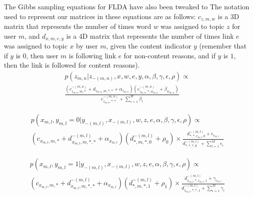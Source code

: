 \documentclass[a4paper]{article}
\begin{document}
The Gibbs sampling equations for FLDA have also been tweaked to 
The notation used to represent our matrices in these equations are as follows: $c_{z, m, w}$ is a 3D matrix that represents the number of times word $w$ was assigned to topic $z$ for user $m$, and $d_{x, m, e, y}$ is a 4D matrix that represents the number of times link $e$ was assigned to topic $x$ by user $m$, given the content indicator $y$ (remember that if $y$ is $0$, then user $m$ is following link $e$ for non-content reasons, and if $y$ is $1$, then the link is followed for content reasons).
\begin{equation}\label{eq:flda_sem}
  \begin{gathered}
    p(z_{m, n} | z_{-(m, n)}, x, w, e, y, \alpha, \beta, \gamma, \epsilon, \rho) \propto \\
      \frac{(c_{z_{m, n}, m, *}^{-(m, n)} + d_{z_{m, n}, m, *, *} + \alpha_{z_{m, n}})
      (c_{z_{m, n}, *, w_{m, n}}^{-(m, n)} + \beta_{w_{m, n}})}
      {c_{z_{m, n}, *, *}^{-(m, n)} + \sum^W_{i = 1}\beta_i}
  \end{gathered}
\end{equation}

\begin{equation}\label{eq:flda_net_0}
  \begin{gathered}
    p(x_{m, l}, y_{m, l} = 0 | y_{-(m, l)}, x_{-(m, l)}, w, z, e, \alpha, \beta, \gamma, \epsilon, \rho) \propto \\
      (c_{x_{m, l}, m, *} + d_{x_{m, l}, m, *, *}^{-(m, l)} + \alpha_{x_{m, l}})(d_{*, m, *, 0}^{-(m, l)} + \rho_0) \times
      \frac{d_{*, *, e_{m, l}, 0}^{-(m, l)} + \epsilon_{e_{m, l}}}
      {d_{*, *, *, 0}^{-(m, l)} + \sum^M_{i = 1}\epsilon_i}
  \end{gathered}
\end{equation}

\begin{equation}\label{eq:flda_net_1}
  \begin{gathered}
    p(x_{m, l}, y_{m, l} = 1 | y_{-(m, l)}, x_{-(m, l)}, w, z, e, \alpha, \beta, \gamma, \epsilon, \rho) \propto \\
      (c_{x_{m, l}, m, *} + d_{x_{m, l}, m, *, *}^{-(m, l)} + \alpha_{x_{m, l}})(d_{*, m, *, 1}^{-(m, l)} + \rho_1) \times
      \frac{d_{x_{m, l}, *, e_{m, l}, 1}^{-(m, l)} + \gamma_{e_{m, l}}}
      {d_{x_{m, l}, *, *, 1}^{-(m, l)} + \sum^M_{i = 1}\gamma_i}
  \end{gathered}
\end{equation}
\end{document}
